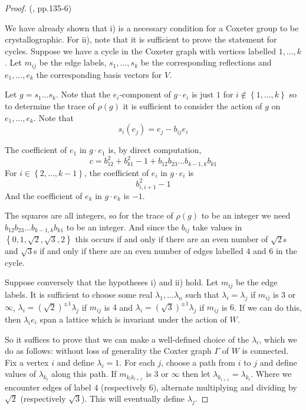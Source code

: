 \documentclass[11pt,a4paper]{report}
\theoremstyle{definition}
\begin{document}
\begin{proof} (\cite{Humphreys}, pp.135-6)

We have already shown that i) is a necessary condition for a Coxeter group to be crystallographic. For ii), note that it is sufficient to prove the statement for cycles. Suppose we have a cycle in the Coxeter graph with vertices labelled $1, \ldots, k$. Let $m_{ij}$ be the edge labels, $s_1, \ldots, s_k$ be the corresponding reflections and $e_1, \ldots, e_k$ the corresponding basis vectors for $V$. 

Let $g = s_1\ldots s_k$. Note that the $e_i$-component of $g \cdot e_i$ is just $1$ for $i \notin \left\{1, \ldots, k\right\}$ so to determine the trace of $\rho(g)$ it is sufficient to consider the action of $g$ on $e_1, \ldots, e_k$. Note that \begin{equation*}s_i(e_j) = e_j - b_{ij} e_i\end{equation*}

The coefficient of $e_1$ in $g \cdot e_1$ is, by direct computation, \begin{equation*}c = b_{12}^2 + b_{k1}^2 -1 + b_{12} b_{23} \ldots b_{k-1, k} b_{k1}\end{equation*} For $i \in \left\{2, \ldots, k-1\right\}$, the coefficient of $e_i$ in $g \cdot e_i$ is \begin{equation*}b_{i,i+1}^2 - 1\end{equation*} And the coefficient of $e_k$ in $g \cdot e_k$ is $-1$. 

The squares are all integers, so for the trace of $\rho(g)$ to be an integer we need $b_{12} b_{23} \ldots b_{k-1, k} b_{k1}$ to be an integer. And since the $b_{ij}$ take values in $\left\{0,1, \sqrt{2}, \sqrt{3}, 2\right\}$ this occurs if and only if there are an even number of $\sqrt{2}$s and $\sqrt{3}$s if and only if there are an even number of edges labelled $4$ and $6$ in the cycle. 

Suppose conversely that the hypotheses i) and ii) hold. Let $m_{ij}$ be the edge labels. It is sufficient to choose some real $\lambda_1, \ldots \lambda_n$ such that $\lambda_i = \lambda_j$ if $m_{ij}$ is $3$ or $\infty$, $\lambda_i = (\sqrt{2})^{\pm 1} \lambda_j$ if $m_{ij}$ is $4$ and $\lambda_i = (\sqrt{3})^{\pm 1} \lambda_j$ if $m_{ij}$ is $6$. If we can do this, then $\lambda_i e_i$ span a lattice which is invariant under the action of $W$.

So it suffices to prove that we can make a well-defined choice of the $\lambda_i$, which we do as follows: without loss of generality the Coxter graph $\Gamma$ of $W$ is connected. Fix a vertex $i$ and define $\lambda_i = 1$. For each $j$, choose a path from $i$ to $j$ and define values of $\lambda_{k_l}$ along this path. If $m_{k_l k_{l+1}}$ is $3$ or $\infty$ then let $\lambda_{k_{l+1}} = \lambda_{k_l}$. Where we encounter edges of label $4$ (respectively $6$), alternate multiplying and dividing by $\sqrt{2}$ (respectively $\sqrt{3}$). This will eventually define $\lambda_j$.


\end{proof}
\end{document}
